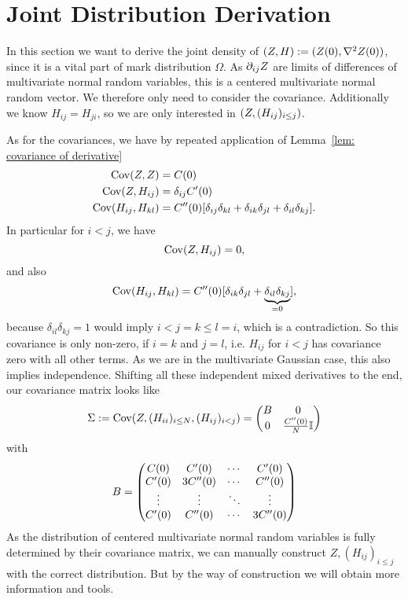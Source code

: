 \section{Joint Distribution Derivation}


In this section we want to derive the joint density of \((Z, H):=
(Z(0), \nabla^2Z(0))\), since it is a vital part of mark distribution
\(\Omega\). As \(\partial_{ij}Z\) are limits of differences of multivariate
normal random variables, this is a centered multivariate normal
random vector. We therefore only need to consider the covariance. Additionally
we know \(H_{ij} = H_{ji}\), so we are only interested
in \((Z, (H_{ij})_{i\le j})\).

As for the covariances, we have by repeated application of Lemma~\ref{lem:
covariance of derivative}
\begin{align*}
	\operatorname{Cov}(Z,Z) &= C(0)\\
	\operatorname{Cov}(Z, H_{ij}) &= \delta_{ij} C'(0)\\
	\operatorname{Cov}(H_{ij}, H_{kl}) &= C''(0)
	[\delta_{ij}\delta_{kl} + \delta_{ik}\delta_{jl} + \delta_{il}\delta_{kj}].
\end{align*}
In particular for \(i<j\), we have
\[
	\operatorname{Cov}(Z, H_{ij}) = 0,
\]
and also
\[
	\operatorname{Cov}(H_{ij}, H_{kl}) = C''(0)
	[\delta_{ik}\delta_{jl} + \underbrace{\delta_{il}\delta_{kj}}_{=0}],
\]
because \(\delta_{il}\delta_{kj}=1\) would imply \(i < j = k \le l = i\), which
is a contradiction. So this covariance is only non-zero, if \(i=k\) and \(j=l\),
i.e. \(H_{ij}\) for \(i<j\) has covariance zero with all other terms.
As we are in the multivariate Gaussian case, this also implies independence.
Shifting all these independent mixed derivatives to the end, our covariance
matrix looks like
\[
	\Sigma := \operatorname{Cov}(Z, (H_{ii})_{i\le N}, (H_{ij})_{i<j})
	= \begin{pmatrix}
		B & 0\\
		0 & \frac{C''(0)}{N}\mathbb{I}
	\end{pmatrix}
\]
with
\[
	B = \begin{pmatrix}
		C(0) & C'(0)	& \cdots & C'(0) \\
		C'(0) & 3C''(0) &  \cdots & C''(0) \\
		\vdots & \vdots & \ddots & \vdots \\
		C'(0) & C''(0) & \cdots &  3 C''(0)
	\end{pmatrix}
\]
As the distribution of centered multivariate normal random variables is fully
determined by their covariance matrix, we can manually construct
\(Z,(H_{ij})_{i\le j}\) with the correct distribution. But by the way of
construction we will obtain more information and tools.

